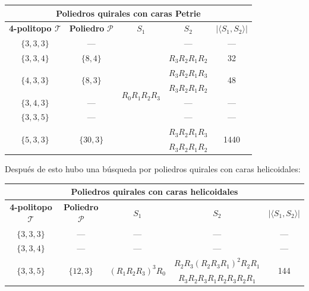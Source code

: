 \documentclass[spanish]{article}
\theoremstyle{definition}
\newcommand{\p}{\mathcal{P}}
\newcommand{\T}{\mathcal{T}}
\begin{document}
\begin{center}
	\begin{tabular}{|c |c| c| c|c|}
	\hline
	\multicolumn{5}{|c|}{\textbf{Poliedros quirales con caras Petrie}}\\
	\hline\textbf{4-politopo $\T$} & \textbf{Poliedro} $\p$ &$S_1$&$S_2$&$|\langle S_1,S_2\rangle|$\\\hline\hline
	$\{3,3,3\}$&—&\multirow{8}{*}{$R_0R_1R_2R_3$}&—&—\\		\cline{1-2}\cline{4-5}
	$\{3,3,4\}$&$\{8,4\}$&&$R_3R_2R_1R_2$&32\\\cline{1-2}	\cline{4-5}
	\multirow{2}{*}{$\{4,3,3\}$}&\multirow{2}{*}{$\{8,3\}$}&&$R_3R_2R_1R_3$&\multirow{2}{*}{48}\\
	&&&$R_3R_2R_1R_2$&\\\cline{1-2}	\cline{4-5}
	$\{3,4,3\}$&—&&—&—\\\cline{1-2}	\cline{4-5}
	$\{3,3,5\}$&—&&—&—\\\cline{1-2}	\cline{4-5}
	\multirow{2}{*}{$\{5,3,3\}$}&\multirow{2}{*}{$\{30,3\}$}&&$R_3R_2R_1R_3$&\multirow{2}{*}{1440}\\
	&&&$R_3R_2R_1R_2$&\\\hline
\end{tabular}
\end{center}

Después de esto hubo una búsqueda por poliedros quirales con caras helicoidales:

\begin{center}
	\begin{tabular}{|c |c| c| c|c|}
		\hline
		\multicolumn{5}{|c|}{\textbf{Poliedros quirales con caras helicoidales}}\\
		\hline\textbf{4-politopo $\T$} & \textbf{Poliedro} $\p$ &$S_1$&$S_2$&$|\langle S_1,S_2\rangle|$\\\hline\hline
		$\{3,3,3\}$&—&—&—&—\\\hline
		$\{3,3,4\}$&—&—&—&—\\\hline
		\multirow{2}{*}{$\{3,3,5\}$}&\multirow{2}{*}{$\{12,3\}$}&\multirow{2}{*}{$(R_1R_2R_3)^3R_0$}&$R_2R_3(R_2R_3R_1)^2R_2R_1$&\multirow{2}{*}{144}\\
		&&&$R_3R_2R_3R_1R_2R_3R_2R_1$&\\
		\hline
	\end{tabular}
\end{center}
\end{document}
